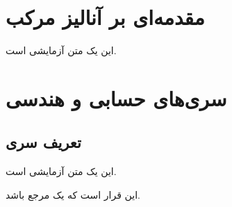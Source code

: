 \documentclass[svgnames]{report}
\begin{document}
\tableofcontents
\chapter{مقدمه‌ای بر آنالیز مرکب}
این یک متن آزمایشی است.
\chapter{سری‌های حسابی و هندسی}
\section{تعریف سری}
این یک متن آزمایشی است.
\begin{thebibliography}{99}
این قرار است که یک مرجع باشد.
\end{thebibliography}
\end{document}
